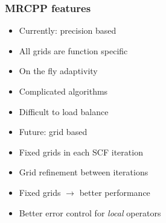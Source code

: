 \begin{frame}
    \frametitle{MRCPP features}
    \begin{itemize}
        \item Currently: precision based
        \item All grids are function specific
        \item On the fly adaptivity
        \item Complicated algorithms
        \item Difficult to load balance
    \end{itemize}
    \vspace{5mm}
    \begin{itemize}
        \item Future: grid based
        \item Fixed grids in each SCF iteration
        \item Grid refinement between iterations
        \item Fixed grids $\longrightarrow$ better performance
        \item Better error control for \emph{local} operators
    \end{itemize}
\end{frame}

